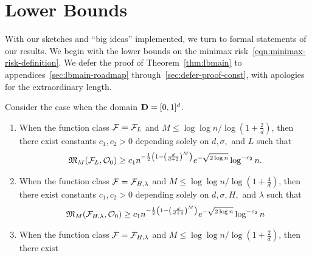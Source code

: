 \newcommand{\Conthm}{C}
\newcommand{\conthm}{c}

\section{Lower Bounds}

With our sketches and ``big ideas'' implemented, we turn to formal
statements of our results. We begin with the lower bounds on the minimax
risk~\eqref{eqn:minimax-risk-definition}.  We defer the proof of
Theorem~\ref{thm:lbmain} to appendices~\ref{sec:lbmain-roadmap}
through~\ref{sec:defer-proof-const}, with apologies for the extraordinary
length.
\begin{theorem}
  \label{thm:lbmain}
  Consider the case when the domain $\mathbf{D} = [0, 1]^d$. 
  \begin{enumerate}[1.]
  \item When the function class $\mathcal{F} = \mathcal{F}_L$ and $M \leq \log
    \log n/\log \left(1+ \frac{2}{d}\right)$, then there exist
    constants $\conthm_1, \conthm_2>0$ depending solely on $d, \sigma,$ and $L$ such that
    \begin{equation*}
      \begin{array}{l}
	\minimax_M(\ffamily_L, \ofamilyz) \geq \conthm_1
	n^{-\half \left(1 - \left( \frac{d}{d+2} \right)^M \right)  } 
	e^{-\sqrt{2\log n}} \log^{-\conthm_2} n.
      \end{array}
    \end{equation*}
  \item When the function class $\mathcal{F} = \mathcal{F}_{H, \lambda}$ and $M
    \leq \log \log n/\log \left(1+ \frac{4}{d}\right)$, then there exist
    constants $\conthm_1, \conthm_2 > 0$ depending solely on $d, \sigma, H,$ and $\lambda$ such
    that
    \begin{align*}
      \minimax_M(\ffamily_{H, \lambda}, \ofamilyz) \geq \conthm_1
      n^{-\half \left(1 - \left( \frac{d}{d+4} \right)^M \right)  } 
      e^{-\sqrt{2\log n}} \log^{-\conthm_2} n
    \end{align*}
  \item When the function class $\mathcal{F} = \mathcal{F}_{H, \lambda}$ and $M
    \leq \log \log n/\log \left(1+ \frac{2}{d}\right)$, then there exist

\end{enumerate}
\end{theorem}
